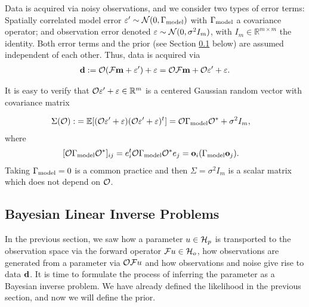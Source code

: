 Data is acquired via noisy observations, and we consider two types of
error terms: Spatially correlated model error \(\varepsilon' \sim
\mathcal{N}(0,\Gamma_{\textup{model}})\) with \(\Gamma_{\textup{model}}\) a covariance operator; and
observation error denoted \(\varepsilon \sim \mathcal{N}(0, \sigma^2 I_m)\), with
\(I_m \in \mathbb{R}^{m \times m}\) the identity. Both error terms and
the prior (see Section \ref{subsec:bayesian_inverse_problems} below)
are assumed independent of each other. Thus, data is acquired via
\begin{align}\label{eq:inverse_problem}
  \data := \obs (\fwd \param + \eps') + \eps = \obs \fwd \param + \obs \eps' + \eps.
\end{align}

It is easy to verify that \(\mathcal{O} \varepsilon' + \varepsilon \in \mathbb{R}^m\) is a centered
Gaussian random vector with covariance matrix

\begin{align}\label{eq:Sigma}
  \begin{split}
    \Sigma(\obs) :&= \mathbb{E}[ (\obs \eps' + \eps) (\obs \eps' +
      \eps)^t ]
    = \obs \modcov \obs^* + \sigma^2I_m , 
  \end{split}
\end{align}
where
\begin{align}\label{eq:modcov_explained}
  \begin{split}
    [\obs \modcov \obs^*]_{ij} & = e_i^t \obs \modcov \obs^* e_j 
    = \meas_i (\modcov \meas_j).%
  \end{split}
\end{align}
Taking \(\Gamma_{\textup{model}} = 0\) is a common practice
\cite{tarantola2005,kaipio2005,Vogel02} and then \(\Sigma =
\sigma^2I_m\) is a scalar matrix which does not depend on \(\mathcal{O}\).

\subsection{Bayesian Linear Inverse Problems}\label{subsec:bayesian_inverse_problems}
In the previous section, we saw how a parameter $u\in \mathcal{H}_p$ is
transported to the observation space via the forward operator $\mathcal{F} u
\in \mathcal{H}_o$, how observations are generated from a parameter via $\mathcal{O}
\mathcal{F} u$ and how observations and noise give rise to data $\mathbf{d}$. It
is time to formulate the process of inferring the parameter as a
Bayesian inverse problem. We have already defined the likelihood in
the previous section, and now we will define the prior.

